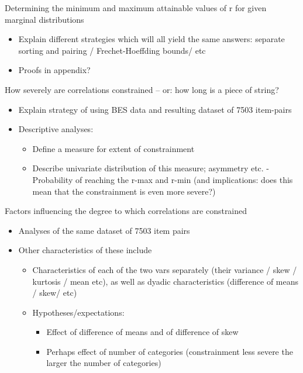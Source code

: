 \documentclass[
  12pt,
]{article}
\providecommand{\tightlist}{%
  \setlength{\itemsep}{0pt}\setlength{\parskip}{0pt}}\usepackage{longtable,booktabs,array}
\theoremstyle{plain}
\theoremstyle{definition}
\theoremstyle{remark}
\begin{document}
Determining the minimum and maximum attainable values of r for given
marginal distributions

\begin{itemize}
\tightlist
\item
  Explain different strategies which will all yield the same answers:
  separate sorting and pairing / Frechet-Hoeffding bounds/ etc
\item
  Proofs in appendix?
\end{itemize}

How severely are correlations constrained -- or: how long is a piece of
string?

\begin{itemize}
\tightlist
\item
  Explain strategy of using BES data and resulting dataset of 7503
  item-pairs
\item
  Descriptive analyses:

  \begin{itemize}
  \tightlist
  \item
    Define a measure for extent of constrainment
  \item
    Describe univariate distribution of this measure; asymmetry etc.
    -Probability of reaching the r-max and r-min (and implications: does
    this mean that the constrainment is even more severe?)
  \end{itemize}
\end{itemize}

Factors influencing the degree to which correlations are constrained

\begin{itemize}
\tightlist
\item
  Analyses of the same dataset of 7503 item pairs
\item
  Other characteristics of these include

  \begin{itemize}
  \tightlist
  \item
    Characteristics of each of the two vars separately (their variance /
    skew / kurtosis / mean etc), as well as dyadic characteristics
    (difference of means / skew/ etc)
  \item
    Hypotheses/expectations:

    \begin{itemize}
    \tightlist
    \item
      Effect of difference of means and of difference of skew
    \item
      Perhaps effect of number of categories (constrainment less severe
      the larger the number of categories)
    \end{itemize}
  \end{itemize}
\end{itemize}
\end{document}

